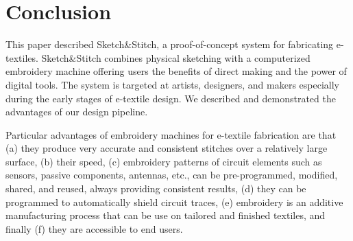 \documentclass[header.tex]{subfiles}
\begin{document}






\section{Conclusion}
This paper described Sketch\&Stitch, a proof-of-concept system for fabricating e-textiles. Sketch\&Stitch combines physical sketching with a computerized embroidery machine offering users the benefits of direct making and the power of digital tools. The system is targeted at artists, designers, and makers especially during the early stages of e-textile design. We described and demonstrated the advantages of our design pipeline.


Particular advantages of embroidery machines for e-textile fabrication are that (a) they produce very accurate and consistent stitches over a relatively large surface, (b) their speed, (c) embroidery patterns of circuit elements such as sensors, passive components, antennas, etc., can be pre-programmed, modified, shared, and reused, always providing consistent results, (d) they can be programmed to automatically shield circuit traces, (e) embroidery is an additive manufacturing process that can be use on tailored and finished textiles, 
and finally (f) they are accessible to end users.


\balance{}



\end{document}
